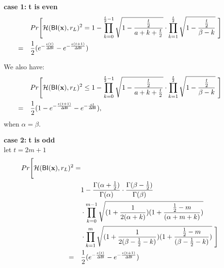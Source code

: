 \documentclass{article}
\begin{document}
\begin{itemize}
  \item[\textbf{case 1:}] \textbf{t is even}\\
  \begin{align*}
  & Pr\Bigg[\mathcal{H}(\mathsf{BI}(\textbf{x}), r_L )^2 
  = 1 - \prod_{k = 0}^{\frac{t}{2} - 1}
  \sqrt{1 - \frac{\frac{t}{2}}{a + k + \frac{t}{2}}}
  \cdot
  \prod_{k = 1}^{\frac{t}{2}}
  \sqrt{1 - \frac{\frac{t}{2}}{\beta - k}}\ \Bigg] \\
  = \quad & \frac{1}{2} (e^{- \frac{\epsilon (t)}{\Delta \mathsf{BI}}} - e^{- \frac{\epsilon (t + 1)}{\Delta \mathsf{BI}}})\\
  \end{align*}

  We also have:
  \begin{align*}
  & Pr\Bigg[\mathcal{H}(\mathsf{BI}(\textbf{x}), r_L )^2 
  \leq 1 - \prod_{k = 0}^{\frac{t}{2} - 1}
  \sqrt{1 - \frac{\frac{t}{2}}{a + k + \frac{t}{2}}}
  \cdot
  \prod_{k = 1}^{\frac{t}{2}}
  \sqrt{1 - \frac{\frac{t}{2}}{\beta - k}}\ \Bigg] \\
  = \quad & \frac{1}{2} (1 - e^{- \frac{\epsilon (t + 1)}{\Delta \mathsf{BI}}}- e^{- \frac{\epsilon t}{\Delta \mathsf{BI}}}),
  \end{align*} 
  when $\alpha = \beta$.

  \item[\textbf{case 2:}] \textbf{t is odd}\\
  let $t = 2 m + 1$
  \begin{align*}
  Pr\Bigg[ \mathcal{H}(\mathsf{BI}(\textbf{x}), r_L )^2 = & \\
  \qquad &
  1 - \frac{\Gamma(\alpha+\frac{1}{2})}{\Gamma(\alpha)} \cdot
\frac{\Gamma(\beta - \frac{1}{2})}{\Gamma(\beta)}\\
\qquad &\cdot 
  \prod_{k = 0}^{m-1}
  \sqrt{(1 + \frac{1}{2(\alpha + k)})
  (1 + \frac{\frac{1}{2} - m}{(\alpha + m  + k)})
  } \\
  \qquad & \cdot 
  \prod_{k = 1}^{m} 
  \sqrt{(1 + \frac{1}{2(\beta - \frac{1}{2}- k)})(1 + \frac{\frac{1}{2} - m}{(\beta - \frac{1}{2}- k)})}\ \Bigg] \\
  = \quad & \frac{1}{2} (e^{- \frac{\epsilon (t)}{\Delta \mathsf{BI}}} - e^{- \frac{\epsilon (t + 1)}{\Delta \mathsf{BI}}})\\
  \end{align*}
 


\end{itemize}
\end{document}
